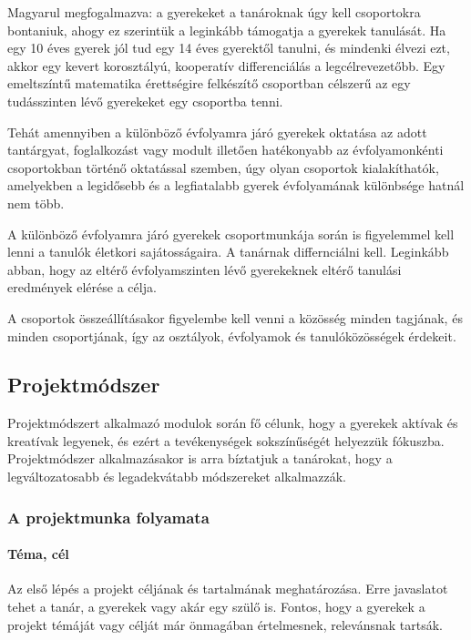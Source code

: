 Magyarul megfogalmazva: a gyerekeket a tanároknak úgy kell csoportokra
bontaniuk, ahogy ez szerintük a leginkább támogatja a gyerekek tanulását.
Ha egy 10 éves gyerek jól tud egy 14 éves gyerektől tanulni, és mindenki
élvezi ezt, akkor egy kevert korosztályú, kooperatív differenciálás a
legcélrevezetőbb. Egy emeltszíntű matematika érettségire felkészítő
csoportban célszerű az egy tudásszinten lévő gyerekeket egy csoportba
tenni.

Tehát amennyiben a különböző évfolyamra járó gyerekek oktatása az adott
tantárgyat, foglalkozást vagy modult illetően hatékonyabb az
évfolyamonkénti csoportokban történő oktatással szemben, úgy olyan
csoportok kialakíthatók, amelyekben a legidősebb és a legfiatalabb
gyerek évfolyamának különbsége hatnál nem több.

A különböző évfolyamra járó gyerekek csoportmunkája során is figyelemmel
kell lenni a tanulók életkori sajátosságaira. A tanárnak differnciálni
kell. Leginkább abban, hogy az eltérő évfolyamszinten lévő gyerekeknek
eltérő tanulási eredmények elérése a célja.

A csoportok összeállításakor figyelembe kell venni a közösség minden
tagjának, és minden csoportjának, így az osztályok, évfolyamok és
tanulóközösségek érdekeit.

\hypertarget{projektmodszer}{%
\subsection{Projektmódszer}\label{projektmodszer}}

Projektmódszert alkalmazó modulok során fő célunk, hogy a gyerekek
aktívak és kreatívak legyenek, és ezért a tevékenységek sokszínűségét
helyezzük fókuszba. Projektmódszer alkalmazásakor is arra bíztatjuk a
tanárokat, hogy a legváltozatosabb és legadekvátabb módszereket
alkalmazzák.

\hypertarget{a-projektmunka-folyamata}{%
\subsubsection{A projektmunka
folyamata}\label{a-projektmunka-folyamata}}

\hypertarget{tema-cel}{%
\paragraph{Téma, cél}\label{tema-cel}}

Az első lépés a projekt céljának és tartalmának meghatározása. Erre
javaslatot tehet a tanár, a gyerekek vagy akár egy szülő is. Fontos,
hogy a gyerekek a projekt témáját vagy célját már önmagában értelmesnek,
relevánsnak tartsák.

